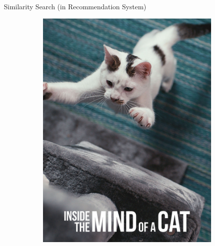 \begin{frame}{Similarity Search (in Recommendation System)}
    \begin{figure}[ht]
        \centering
        \hfill
        \begin{subfigure}{0.33\textwidth}
            \centering
            \includegraphics[height=0.69\textheight]{images/inside-the-mind-of-a-cat.jpg}


\end{subfigure}
\end{figure}
\end{frame}
